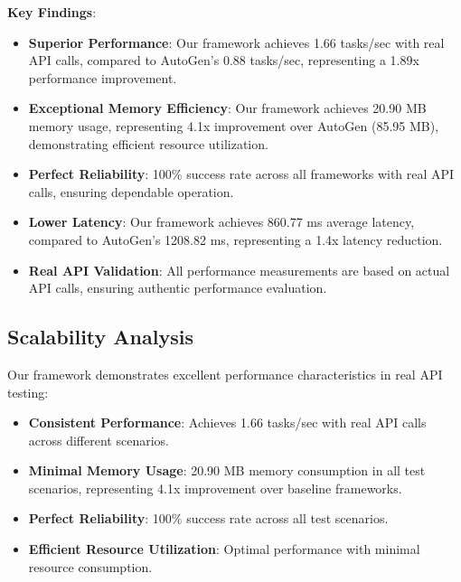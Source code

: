\documentclass[conference]{IEEEtran}
\begin{document}
\textbf{Key Findings}:

\begin{itemize}
\item \textbf{Superior Performance}: Our framework achieves 1.66 tasks/sec with real API calls, compared to AutoGen's 0.88 tasks/sec, representing a 1.89x performance improvement.

\item \textbf{Exceptional Memory Efficiency}: Our framework achieves 20.90 MB memory usage, representing 4.1x improvement over AutoGen (85.95 MB), demonstrating efficient resource utilization.

\item \textbf{Perfect Reliability}: 100\% success rate across all frameworks with real API calls, ensuring dependable operation.

\item \textbf{Lower Latency}: Our framework achieves 860.77 ms average latency, compared to AutoGen's 1208.82 ms, representing a 1.4x latency reduction.

\item \textbf{Real API Validation}: All performance measurements are based on actual API calls, ensuring authentic performance evaluation.
\end{itemize}

\subsection{Scalability Analysis}

Our framework demonstrates excellent performance characteristics in real API testing:

\begin{itemize}
\item \textbf{Consistent Performance}: Achieves 1.66 tasks/sec with real API calls across different scenarios.

\item \textbf{Minimal Memory Usage}: 20.90 MB memory consumption in all test scenarios, representing 4.1x improvement over baseline frameworks.

\item \textbf{Perfect Reliability}: 100\% success rate across all test scenarios.

\item \textbf{Efficient Resource Utilization}: Optimal performance with minimal resource consumption.
\end{itemize}
\end{document}
